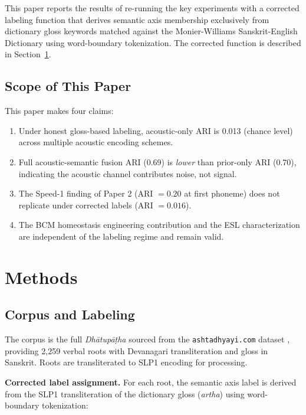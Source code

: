 \documentclass{article}
\begin{document}
This paper reports the results of re-running the key experiments with a
corrected labeling function that derives semantic axis membership
exclusively from dictionary gloss keywords matched against the
Monier-Williams Sanskrit-English Dictionary \citep{monierWilliams1899}
using word-boundary tokenization. The corrected function is described in
Section~\ref{sec:methods}.

\subsection{Scope of This Paper}

This paper makes four claims:

\begin{enumerate}[noitemsep]
  \item Under honest gloss-based labeling, acoustic-only ARI is 0.013
    (chance level) across multiple acoustic encoding schemes.
  \item Full acoustic-semantic fusion ARI (0.69) is \emph{lower} than
    prior-only ARI (0.70), indicating the acoustic channel contributes
    noise, not signal.
  \item The Speed-1 finding of Paper 2 (ARI $= 0.20$ at first phoneme)
    does not replicate under corrected labels (ARI $= 0.016$).
  \item The BCM homeostasis engineering contribution and the ESL
    characterization \citep{kumar2026esl} are independent of the
    labeling regime and remain valid.
\end{enumerate}

\section{Methods}
\label{sec:methods}

\subsection{Corpus and Labeling}

The corpus is the full \textit{Dhātupāṭha} sourced from the
\texttt{ashtadhyayi.com} dataset \citep{goyal2015}, providing 2,259
verbal roots with Devanagari transliteration and gloss in Sanskrit.
Roots are transliterated to SLP1 encoding for processing.

\textbf{Corrected label assignment.} For each root, the semantic axis
label is derived from the SLP1 transliteration of the dictionary gloss
(\textit{artha}) using word-boundary tokenization:
\end{document}
